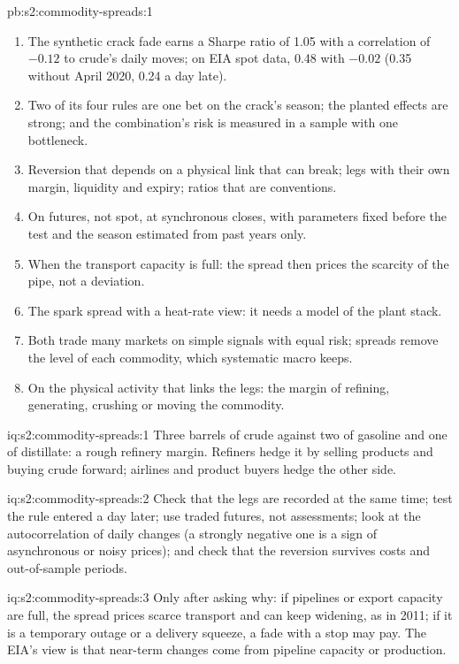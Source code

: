 \begin{solution}{pb:s2:commodity-spreads:1}
\begin{enumerate}
\item The synthetic crack fade earns a Sharpe ratio of 1.05 with a correlation of $-0.12$ to crude's daily moves; on EIA spot data, 0.48 with
$-0.02$ (0.35 without April 2020, 0.24 a day late).
\item Two of its four rules are one bet on the crack's season; the planted effects are strong; and the combination's risk is measured in a sample
with one bottleneck.
\item Reversion that depends on a physical link that can break; legs with their own margin, liquidity and expiry; ratios that are conventions.
\item On futures, not spot, at synchronous closes, with parameters fixed before the test and the season estimated from past years only.
\item When the transport capacity is full: the spread then prices the scarcity of the pipe, not a deviation.
\item The spark spread with a heat-rate view: it needs a model of the plant stack.
\item Both trade many markets on simple signals with equal risk; spreads remove the level of each commodity, which systematic macro keeps.
\item On the physical activity that links the legs: the margin of refining, generating, crushing or moving the commodity.
\end{enumerate}
\end{solution}

\begin{solution}{iq:s2:commodity-spreads:1}
Three barrels of crude against two of gasoline and one of distillate: a rough refinery margin. Refiners hedge it by selling products and buying crude
forward; airlines and product buyers hedge the other side.
\end{solution}

\begin{solution}{iq:s2:commodity-spreads:2}
Check that the legs are recorded at the same time; test the rule entered a day later; use traded futures, not assessments; look at the
autocorrelation of daily changes (a strongly negative one is a sign of asynchronous or noisy prices); and check that the reversion survives costs
and out-of-sample periods.
\end{solution}

\begin{solution}{iq:s2:commodity-spreads:3}
Only after asking why: if pipelines or export capacity are full, the spread prices scarce transport and can keep widening, as in 2011; if it is a
temporary outage or a delivery squeeze, a fade with a stop may pay. The EIA's view is that near-term changes come from pipeline capacity or
production.
\end{solution}

